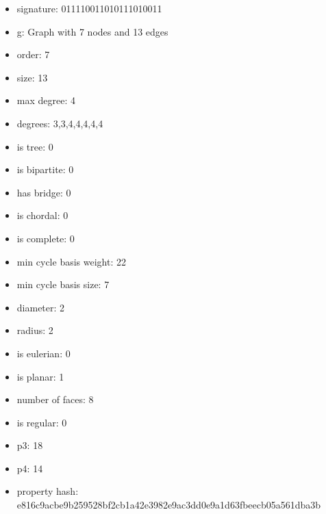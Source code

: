 \begin{itemize}
\item signature: 011110011010111010011
\item g: Graph with 7 nodes and 13 edges
\item order: 7
\item size: 13
\item max degree: 4
\item degrees: 3,3,4,4,4,4,4
\item is tree: 0
\item is bipartite: 0
\item has bridge: 0
\item is chordal: 0
\item is complete: 0
\item min cycle basis weight: 22
\item min cycle basis size: 7
\item diameter: 2
\item radius: 2
\item is eulerian: 0
\item is planar: 1
\item number of faces: 8
\item is regular: 0
\item p3: 18
\item p4: 14
\item property hash: e816c9acbe9b259528bf2cb1a42e3982e9ac3dd0e9a1d63fbeecb05a561dba3b
\end{itemize}
\newpage
